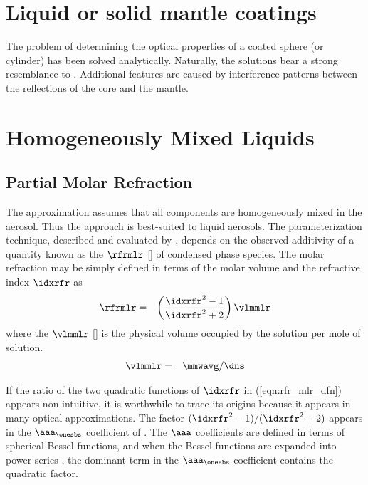 \documentclass[12pt,twoside]{book}
\begin{document}
\section[Liquid or solid mantle coatings]{Liquid or solid mantle coatings}\label{sxn:idx_rfr_mntl}
The problem of determining the optical properties of a coated sphere
(or cylinder) has been solved analytically.
Naturally, the solutions bear a strong resemblance to .
Additional features are caused by interference patterns between the
reflections of the core and the mantle.

\section[Homogeneously Mixed Liquids]{Homogeneously Mixed Liquids}\label{sxn:idx_rfr_lqd}

\subsection[Partial Molar Refraction]{Partial Molar Refraction}\label{sxn:apx_pmr}
The  approximation assumes that all
components are homogeneously mixed in the aerosol.
Thus the approach is best-suited to liquid aerosols.
The parameterization technique, described and evaluated by
\cite{Ste90}, depends on the observed additivity of a quantity 
known as the  $\rfrmlr$ [\mCxmol] of
condensed phase species.
The molar refraction may be simply defined in terms of the
molar volume and the refractive index $\idxrfr$ as 
\begin{eqnarray}
\rfrmlr & = & \left( \frac{\idxrfr^{2} -1}{\idxrfr^{2} + 2} \right)
\vlmmlr 
\label{eqn:rfr_mlr_dfn}
\end{eqnarray}
where the  $\vlmmlr$ [\mCxmol] is the physical
volume occupied by the solution per mole of solution.
\begin{eqnarray}
\vlmmlr & = & \mmwavg / \dns
\label{eqn:vlm_mlr_dfn}
\end{eqnarray}

If the ratio of the two quadratic functions of $\idxrfr$ in
(\ref{eqn:rfr_mlr_dfn}) appears non-intuitive, it is worthwhile to
trace its origins because it appears in many optical approximations. 
The factor $(\idxrfr^{2} -1)/(\idxrfr^{2} + 2)$ appears in the 
$\aaa_{\onesbs}$ coefficient of .
The $\aaa$ coefficients are defined in terms of spherical Bessel
functions, and when the Bessel functions are expanded into power
series \cite[e.g.,][p. 131]{BoH83}, the dominant term in the
$\aaa_{\onesbs}$ coefficient contains the quadratic factor.
\end{document}
